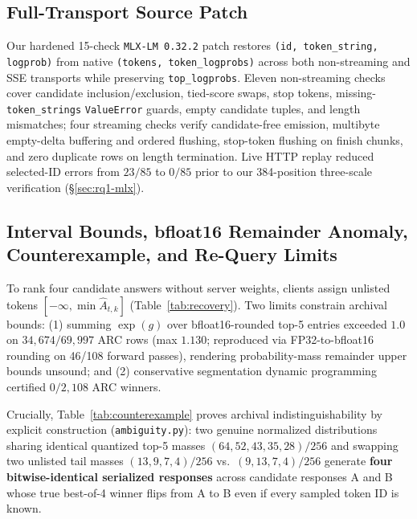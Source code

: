 \documentclass[11pt,letterpaper]{article}
\begin{document}
\subsection{Full-Transport Source Patch}\label{sec:patch}
Our hardened 15-check \texttt{MLX-LM 0.32.2} patch restores \texttt{(id, token\_string, logprob)} from native \texttt{(tokens, token\_logprobs)} across both non-streaming and SSE transports while preserving \texttt{top\_logprobs}. Eleven non-streaming checks cover candidate inclusion/exclusion, tied-score swaps, stop tokens, missing-\texttt{token\_strings} \texttt{ValueError} guards, empty candidate tuples, and length mismatches; four streaming checks verify candidate-free emission, multibyte empty-delta buffering and ordered flushing, stop-token flushing on finish chunks, and zero duplicate rows on length termination. Live HTTP replay reduced selected-ID errors from $23/85$ to $0/85$ prior to our 384-position three-scale verification (\S\ref{sec:rq1-mlx}).

\subsection{Interval Bounds, bfloat16 Remainder Anomaly, Counterexample, and Re-Query Limits}
To rank four candidate answers without server weights, clients assign unlisted tokens $[-\infty, \min \hat{A}_{t,k}]$ (Table~\ref{tab:recovery}). Two limits constrain archival bounds: (1) summing $\exp(g)$ over bfloat16-rounded top-5 entries exceeded $1.0$ on $34{,}674/69{,}997$ ARC rows (max $1.130$; reproduced via FP32-to-bfloat16 rounding on 46/108 forward passes), rendering probability-mass remainder upper bounds unsound; and (2) conservative segmentation dynamic programming certified $0/2{,}108$ ARC winners.

Crucially, Table~\ref{tab:counterexample} proves archival indistinguishability by explicit construction (\texttt{ambiguity.py}): two genuine normalized distributions sharing identical quantized top-5 masses $(64,52,43,35,28)/256$ and swapping two unlisted tail masses $(13,9,7,4)/256$ vs.\ $(9,13,7,4)/256$ generate \textbf{four bitwise-identical serialized responses} across candidate responses A and B whose true best-of-4 winner flips from A to B even if every sampled token ID is known.
\end{document}
